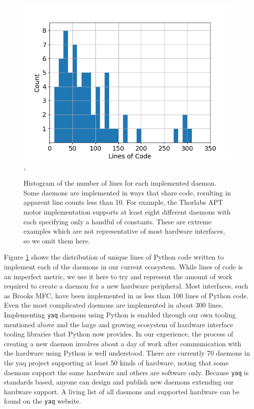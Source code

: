 \documentclass[aip, amsmath, amssymb, reprint,]{revtex4-1}
\newcommand\yaq{\texttt{yaq}}
\begin{document}
\begin{figure}
\includegraphics[width=\columnwidth]{figures/lines_histogram},
	\caption{  \label{fig:histogram} Histogram of the number of lines for each implemented daemon.
	Some daemons are implemented in ways that share code, resulting in apparent line counts less than 10.
	For example, the Thorlabs APT\cite{thorlabs_apt} motor implementation supports at least eight different daemons with each specifying only a handful of constants.
	These are extreme examples which are not representative of most hardware interfaces, so we omit them here.
	}
\end{figure}

Figure \ref{fig:histogram} shows the distribution of unique lines of Python code written to implement each of the daemons in our current ecosystem.
While lines of code is an imperfect metric, we use it here to try and represent the amount of work required to create a daemon for a new hardware peripheral.
Most interfaces, such as Brooks MFC\cite{yaqd-brooks-mfc}, have been implemented in as less than 100 lines of Python code.
Even the most complicated daemons are implemented in about 300 lines.
Implementing \yaq{} daemons using Python is enabled through our own tooling mentioned above and the large and growing ecosystem of hardware interface tooling libraries that Python now provides\cite{}.
In our experience, the process of creating a new daemon involves about a day of work after communication with the hardware using Python is well understood.
There are currently 70 daemons in the yaq project supporting at least 50 kinds of hardware, noting that some daemons support the same hardware and others are software only.
Because \yaq{} is standards based, anyone can design and publish new daemons extending our hardware support.
A living list of all daemons and supported hardware can be found on the \yaq{} website.\cite{}
\end{document}
